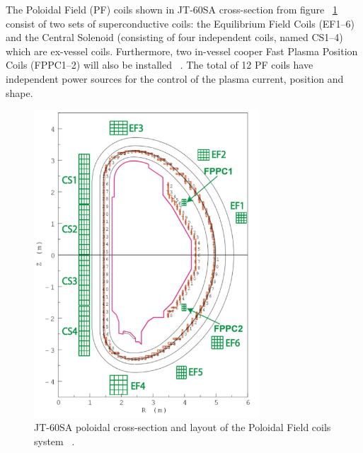 The Poloidal Field (PF) coils shown in JT-60SA cross-section from figure ~\ref{JT60coils} consist of two sets of superconductive coils: the Equilibrium Field Coils (EF1–6) and the Central Solenoid (consisting of four independent coils, named CS1–4) which are ex-vessel coils. Furthermore, two in-vessel cooper Fast Plasma Position  Coils (FPPC1–2) will also be installed ~\cite{NCruz}. The total of 12 PF coils have independent power sources for the control of the plasma current, position and shape.   
\smallskip

\begin{figure}
	\centering
	\includegraphics[width=0.75\textwidth]{Chp3/JT60Coils.png}

	\caption{	\label{JT60coils}JT-60SA poloidal cross-section and layout of the Poloidal Field coils system ~\cite{NCruz}.}
\end{figure}

